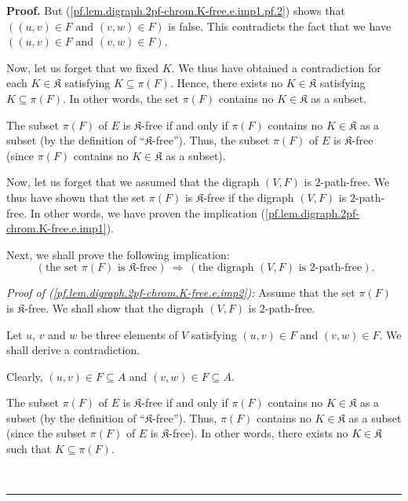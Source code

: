 \documentclass[numbers=enddot,12pt,final,onecolumn,notitlepage]{scrartcl}%
\theoremstyle{definition}
\newenvironment{proof}[1][Proof]{\noindent\textbf{#1.} }{\ \rule{0.5em}{0.5em}}
\newenvironment{verlong}{}{}
\begin{document}
\begin{verlong}
\begin{proof}
But (\ref{pf.lem.digraph.2pf-chrom.K-free.e.imp1.pf.2}) shows that $\left(
\left(  u,v\right)  \in F\text{ and }\left(  v,w\right)  \in F\right)  $ is
false. This contradicts the fact that we have $\left(  \left(  u,v\right)  \in
F\text{ and }\left(  v,w\right)  \in F\right)  $.

Now, let us forget that we fixed $K$. We thus have obtained a contradiction
for each $K\in\mathfrak{K}$ satisfying $K\subseteq\pi\left(  F\right)  $.
Hence, there exists no $K\in\mathfrak{K}$ satisfying $K\subseteq\pi\left(
F\right)  $. In other words, the set $\pi\left(  F\right)  $ contains no
$K\in\mathfrak{K}$ as a subset.

The subset $\pi\left(  F\right)  $ of $E$ is $\mathfrak{K}$-free if and only
if $\pi\left(  F\right)  $ contains no $K\in\mathfrak{K}$ as a subset (by the
definition of \textquotedblleft$\mathfrak{K}$-free\textquotedblright). Thus,
the subset $\pi\left(  F\right)  $ of $E$ is $\mathfrak{K}$-free (since
$\pi\left(  F\right)  $ contains no $K\in\mathfrak{K}$ as a subset).

Now, let us forget that we assumed that the digraph $\left(  V,F\right)  $ is
$2$-path-free. We thus have shown that the set $\pi\left(  F\right)  $ is
$\mathfrak{K}$-free if the digraph $\left(  V,F\right)  $ is $2$-path-free. In
other words, we have proven the implication
(\ref{pf.lem.digraph.2pf-chrom.K-free.e.imp1}).

Next, we shall prove the following implication:%
\begin{equation}
\ \left(  \text{the set }\pi\left(  F\right)  \text{ is }\mathfrak{K}%
\text{-free}\right)  \ \Longrightarrow\ \left(  \text{the digraph }\left(
V,F\right)  \text{ is }2\text{-path-free}\right)  .
\label{pf.lem.digraph.2pf-chrom.K-free.e.imp2}%
\end{equation}


\textit{Proof of (\ref{pf.lem.digraph.2pf-chrom.K-free.e.imp2}):} Assume that
the set $\pi\left(  F\right)  $ is $\mathfrak{K}$-free. We shall show that the
digraph $\left(  V,F\right)  $ is $2$-path-free.

Let $u$, $v$ and $w$ be three elements of $V$ satisfying $\left(  u,v\right)
\in F$ and $\left(  v,w\right)  \in F$. We shall derive a contradiction.

Clearly, $\left(  u,v\right)  \in F\subseteq A$ and $\left(  v,w\right)  \in
F\subseteq A$.

The subset $\pi\left(  F\right)  $ of $E$ is $\mathfrak{K}$-free if and only
if $\pi\left(  F\right)  $ contains no $K\in\mathfrak{K}$ as a subset (by the
definition of \textquotedblleft$\mathfrak{K}$-free\textquotedblright). Thus,
$\pi\left(  F\right)  $ contains no $K\in\mathfrak{K}$ as a subset (since the
subset $\pi\left(  F\right)  $ of $E$ is $\mathfrak{K}$-free). In other words,
there exists no $K\in\mathfrak{K}$ such that $K\subseteq\pi\left(  F\right)  $.


\end{proof}
\end{verlong}
\end{document}
